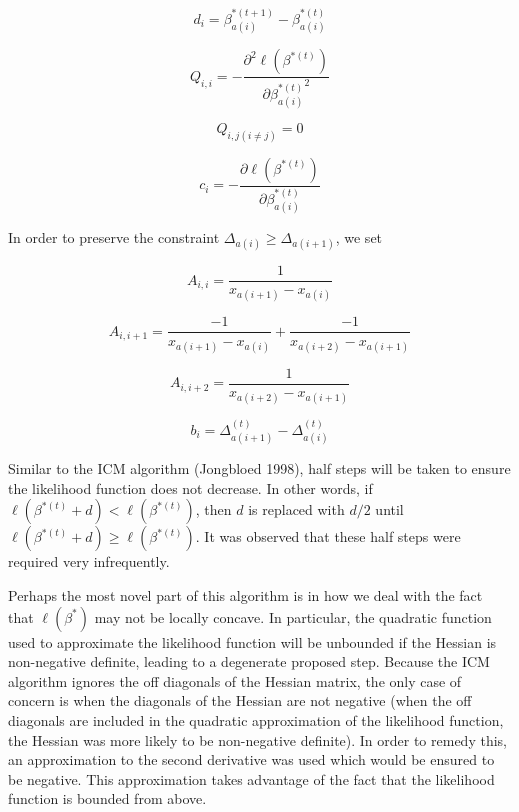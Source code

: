 	\[ d_i = \beta^{*(t+1)}_{a(i)} - \beta^{*(t)}_{a(i)}
	\]
	
	\[Q_{i,i} = - \frac{\partial^2 \ell(\beta^{*(t)} )} {\partial {\beta^{*(t)}_{a(i)}}^2}
	\]
	 
	 \[
	 Q_{i,j (i\neq j)} = 0
	 \]
	 
	\[c_i = -\frac{\partial \ell(\beta^{*(t)})} {\partial \beta_{a(i)}^{*(t)} }
	\]
	
	In order to preserve the constraint $\Delta_{a(i)} \geq \Delta_{a(i+1)}$, we set 
	
	\[ A_{i,i} = \frac{1}{x_{a(i+1)} - x_{a(i)} }
	\]
	
	\[ A_{i, i + 1} = \frac{-1}{x_{a(i+1)} - x_{a(i)} } + \frac{-1}{x_{a(i+2)} - x_{a(i + 1)} }
	\]
	
	\[ A_{i, i + 2} = \frac{1}{x_{a(i+2)} - x_{a(i + 1)} }
	\]
	
	\[ b_i =\Delta_{a(i + 1)}^{(t)} - \Delta_{a(i)}^{(t)}
	\]
	
	Similar to the ICM algorithm (Jongbloed 1998), half steps will be taken to ensure the likelihood function does not decrease. In other words, if $\ell ( \beta^{*(t)} + d ) < \ell ( \beta^{*(t)}  ) $, then $d$ is replaced with $d/2$ until $\ell ( \beta^{*(t)} + d ) \geq \ell ( \beta^{*(t)} )$. It was observed that these half steps were required very infrequently. 
	
	Perhaps the most novel part of this algorithm is in how we deal with the fact that $\ell(\beta^*)$ may not be locally concave. In particular, the quadratic function used to approximate the likelihood function will be unbounded if the Hessian is non-negative definite, leading to a degenerate proposed step. Because the ICM algorithm ignores the off diagonals of the Hessian matrix, the only case of concern is when the diagonals of the Hessian are not negative (when the off diagonals are included in the quadratic approximation of the likelihood function, the Hessian was more likely to be non-negative definite). In order to remedy this, an approximation to the second derivative was used which would be ensured to be negative. This approximation takes advantage of the fact that the likelihood function is bounded from above. 
		
